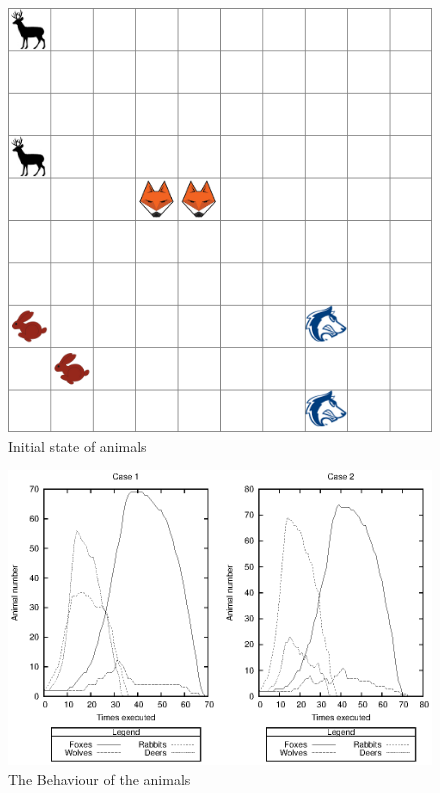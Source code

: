 \documentclass[11pt]{article}
\begin{document}
{
	\begin{figure}[here]
	\centering
	\includegraphics[scale=.65]{init.png}
	\caption{Initial state of animals}
	\label{fig:initialState}
	\end{figure}
}

{
	\begin{figure}[p]
	\centering
	\includegraphics{plots.eps}
	\caption{The Behaviour of the animals}
	\label{fig:animalBehaviour}
	\end{figure}
}
\end{document}
